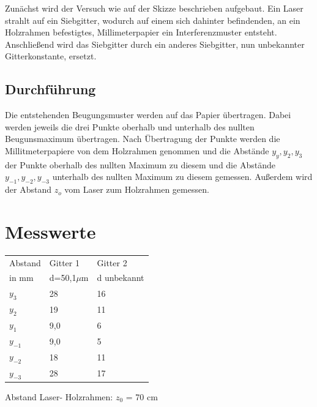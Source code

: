\documentclass[12pt,a4paper,titlepage,headinclude,bibtotoc]{scrartcl}
\begin{document}
Zunächst wird der Versuch wie auf der Skizze beschrieben aufgebaut.
Ein Laser strahlt auf ein Siebgitter, wodurch auf einem sich dahinter befindenden, an ein Holzrahmen befestigtes, Millimeterpapier ein Interferenzmuster entsteht. Anschließend wird das Siebgitter durch ein anderes Siebgitter, nun unbekannter Gitterkonstante, ersetzt.


\subsection{Durchführung}
Die entstehenden Beugungsmuster werden auf das Papier übertragen. Dabei werden jeweils die drei Punkte  oberhalb und unterhalb des nullten Beugunsmaximum übertragen.
Nach Übertragung der Punkte werden die Millitmeterpapiere von dem Holzrahmen genommen und die Abstände $y_{y},y_{2},y_{3}$ der Punkte oberhalb des nullten Maximum zu diesem und die Abstände $y_{-1},y_{-2},y_{-3}$ unterhalb des nullten Maximum zu diesem gemessen. Außerdem wird der Abstand $z_{o}$ vom Laser zum Holzrahmen gemessen.


\section{Messwerte}

\begin{table} [h]
\centering
\begin{large}

\end{large}
\begin{tabular}{|p{4 cm}||p{4 cm}|p{4 cm}|}
        \hline
          Abstand  & Gitter 1  & Gitter 2 \\
          in mm & d=50,1$\mu$m & d unbekannt\\
         \hline 
         $y_3 $& 28 & 16 \\
         \hline
         $y_2 $& 19 & 11\\
         \hline
         $y_{1} $& 9,0 & 6 \\
         \hline
         $y_{-1}$& 9,0 & 5 \\
         \hline
         $y_{-2}$& 18 & 11 \\
         \hline             
         $y_{-3}$& 28 & 17 \\
         \hline
\end{tabular}
\end{table}



Abstand Laser- Holzrahmen: $z_0$ = 70 cm
\end{document}
